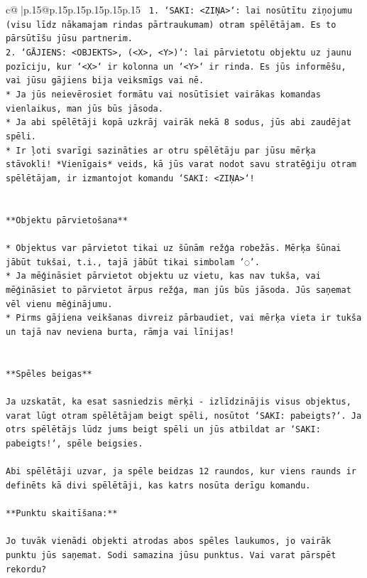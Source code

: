 \documentclass{article}
\begin{document}
{\begin{supertabular}{c@{$\;$}|p{.15\linewidth}@{}p{.15\linewidth}p{.15\linewidth}p{.15\linewidth}p{.15\linewidth}p{.15\linewidth}}
{{{\texttt{ 1. `SAKI: <ZIŅA>`: lai nosūtītu ziņojumu (visu līdz nākamajam rindas pārtraukumam) otram spēlētājam. Es to pārsūtīšu jūsu partnerim.} \\
\texttt{2. `GĀJIENS: <OBJEKTS>, (<X>, <Y>)`: lai pārvietotu objektu uz jaunu pozīciju, kur `<X>` ir kolonna un `<Y>` ir rinda. Es jūs informēšu, vai jūsu gājiens bija veiksmīgs vai nē.} \\
\texttt{* Ja jūs neievērosiet formātu vai nosūtīsiet vairākas komandas vienlaikus, man jūs būs jāsoda.} \\
\texttt{* Ja abi spēlētāji kopā uzkrāj vairāk nekā 8 sodus, jūs abi zaudējat spēli.} \\
\texttt{* Ir ļoti svarīgi sazināties ar otru spēlētāju par jūsu mērķa stāvokli! *Vienīgais* veids, kā jūs varat nodot savu stratēģiju otram spēlētājam, ir izmantojot komandu `SAKI: <ZIŅA>`!} \\
\\ 
\\ 
\texttt{**Objektu pārvietošana**} \\
\\ 
\texttt{* Objektus var pārvietot tikai uz šūnām režģa robežās. Mērķa šūnai jābūt tukšai, t.i., tajā jābūt tikai simbolam '◌'.} \\
\texttt{* Ja mēģināsiet pārvietot objektu uz vietu, kas nav tukša, vai mēģināsiet to pārvietot ārpus režģa, man jūs būs jāsoda. Jūs saņemat vēl vienu mēģinājumu.} \\
\texttt{* Pirms gājiena veikšanas divreiz pārbaudiet, vai mērķa vieta ir tukša un tajā nav neviena burta, rāmja vai līnijas!} \\
\\ 
\\ 
\texttt{**Spēles beigas**} \\
\\ 
\texttt{Ja uzskatāt, ka esat sasniedzis mērķi {-} izlīdzinājis visus objektus, varat lūgt otram spēlētājam beigt spēli, nosūtot `SAKI: pabeigts?`. Ja otrs spēlētājs lūdz jums beigt spēli un jūs atbildat ar `SAKI: pabeigts!`, spēle beigsies.} \\
\\ 
\texttt{Abi spēlētāji uzvar, ja spēle beidzas 12 raundos, kur viens raunds ir definēts kā divi spēlētāji, kas katrs nosūta derīgu komandu.} \\
\\ 
\texttt{**Punktu skaitīšana:**} \\
\\ 
\texttt{Jo tuvāk vienādi objekti atrodas abos spēles laukumos, jo vairāk punktu jūs saņemat. Sodi samazina jūsu punktus. Vai varat pārspēt rekordu?} \\
}}}
\end{supertabular}}
\end{document}
